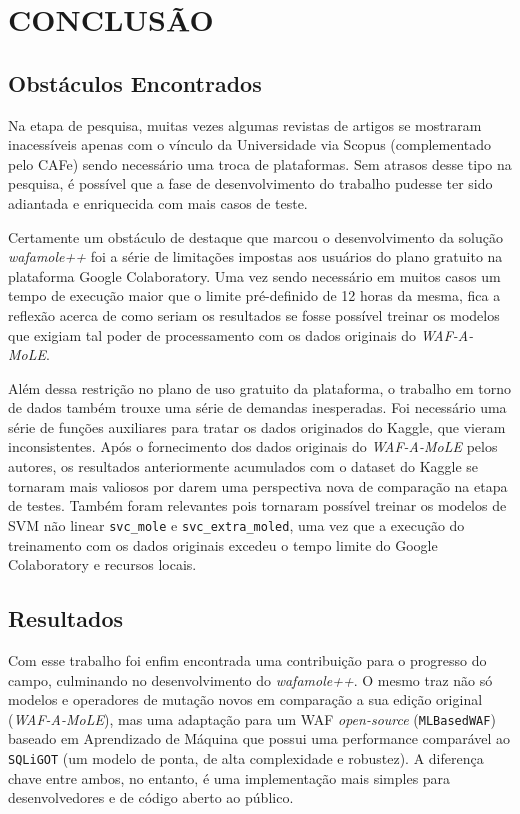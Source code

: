 \chapter{CONCLUSÃO}
\label{chp:capitulo6}

\section{Obstáculos Encontrados}

Na etapa de pesquisa, muitas vezes algumas revistas de artigos se mostraram inacessíveis apenas com o vínculo da Universidade via Scopus (complementado pelo CAFe) sendo necessário uma troca de plataformas. Sem atrasos desse tipo na pesquisa, é possível que a fase de desenvolvimento do trabalho pudesse ter sido adiantada e enriquecida com mais casos de teste.

Certamente um obstáculo de destaque que marcou o desenvolvimento da solução \textit{wafamole++} foi a série de limitações impostas aos usuários do plano gratuito na plataforma Google Colaboratory. Uma vez sendo necessário em muitos casos um tempo de execução maior que o limite pré-definido de 12 horas da mesma, fica a reflexão acerca de como seriam os resultados se fosse possível treinar os modelos que exigiam tal poder de processamento com os dados originais do \textit{WAF-A-MoLE}.

Além dessa restrição no plano de uso gratuito da plataforma, o trabalho em torno de dados também trouxe uma série de demandas inesperadas. Foi necessário uma série de funções auxiliares para tratar os dados originados do Kaggle, que vieram inconsistentes. Após o fornecimento dos dados originais do \textit{WAF-A-MoLE} pelos autores, os resultados anteriormente acumulados com o dataset do Kaggle se tornaram mais valiosos por darem uma perspectiva nova de comparação na etapa de testes. Também foram relevantes pois tornaram possível treinar os modelos de SVM não linear \verb+svc_mole+ e \verb+svc_extra_moled+, uma vez que a execução do treinamento com os dados originais excedeu o tempo limite do Google Colaboratory e recursos locais.

\section{Resultados}

Com esse trabalho foi enfim encontrada uma contribuição para o progresso do campo, culminando no desenvolvimento do \textit{wafamole++}. O mesmo traz não só modelos e operadores de mutação novos em comparação a sua edição original (\textit{WAF-A-MoLE}), mas uma adaptação para um WAF \textit{open-source} (\verb+MLBasedWAF+) baseado em Aprendizado de Máquina que possui uma performance comparável ao \verb+SQLiGOT+ (um modelo de ponta, de alta complexidade e robustez). A diferença chave entre ambos, no entanto, é uma implementação mais simples para desenvolvedores e de código aberto ao público.

